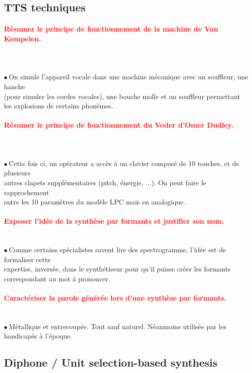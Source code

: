 \documentclass[letterpaper, 12pt]{article}
\newcommand{\alinea}{
\hspace*{0.3cm}}
\newcommand{\red}[1]{
	\textcolor{red}{#1}
}
\newcommand{\point}{$\bullet\ $}
\begin{document}
	\subsection{TTS techniques}
		\paragraph{\red{Résumer le principe de fonctionnement de la machine de Von Kempelen.}}~\\~\\
			\point On simule l'appareil vocale dans une machine mécanique avec un souffleur, une hanche
				\\\alinea (pour simuler les cordes vocales), une bouche molle et un souffleur permettant
				\\\alinea les explosions de certains phonèmes.
		\paragraph{\red{Résumer le principe de fonctionnement du Voder d'Omer Dudley.}}~\\~\\
    		\point Cette fois ci, un opérateur a accès à un clavier composé de 10 touches, et de plusieurs
    			\\\alinea autres clapets supplémentaires (pitch, énergie, ...). On peut faire le rapprochement
    			\\\alinea entre les 10 paramètres du modèle LPC mais en analogique.
    	\paragraph{\red{Exposer l'idée de la synthèse par formants et justifier son nom.}}~\\
			\point Comme certains spécialistes savent lire des spectrogramme, l'idée est de formaliser cette
				\\\alinea expertise, inversée, dans le synthétiseur pour qu'il puisse créer les formants
				\\\alinea correspondant au mot à prononcer.
		\paragraph{\red{Caractériser la parole générée lors d'une synthèse par formants.}}~\\
			\point Métallique et entrecoupée. Tout sauf naturel. Néanmoins utilisée par les handicapés à l'époque.
	\subsection{Diphone / Unit selection-based synthesis}
\end{document}
